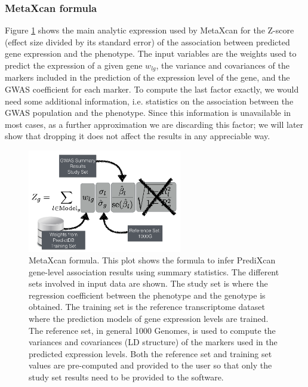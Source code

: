 \documentclass[10pt]{article}
\begin{document}
\subsubsection*{MetaXcan formula}

Figure \ref{fig:metaxcan-formula} shows the main analytic expression used by MetaXcan for the Z-score (effect size divided by its standard error) of the association between predicted gene expression and the phenotype. The input variables are the weights used to predict the expression of a given gene $w_{lg}$, the variance and covariances of the markers included in the prediction of the expression level of the gene, and the GWAS coefficient for each marker. To compute the last factor exactly, we would need some additional information, i.e. statistics on the association between the GWAS population and the phenotype. Since this information is unavailable in most cases, as a further approximation we are discarding this factor; we will later show that dropping it does not affect the results in any appreciable way.


\begin{figure}
\begin{center}
\includegraphics[width=0.6\textwidth]{plots/Fig2-MetaXcan-Formula.png}
\caption{MetaXcan formula. This plot shows the formula to infer PrediXcan gene-level association results using summary statistics. The different sets involved in input data are shown. The study set is where the regression coefficient between the phenotype and the genotype is obtained. The training set is the reference transcriptome dataset where the prediction models of gene expression levels are trained. The reference set, in general 1000 Genomes, is used to compute the variances and covariances (LD structure) of the markers used in the predicted expression levels. Both the reference set and training set values are pre-computed and provided to the user so that only the study set results need to be provided to the software.} %
\label{fig:metaxcan-formula}
\end{center}
\end{figure}
\end{document}
